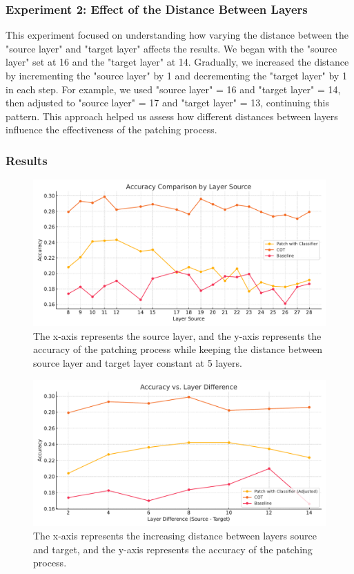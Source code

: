 \documentclass[11pt]{article}
\begin{document}
\subsubsection*{Experiment 2: Effect of the Distance Between Layers}
This experiment focused on understanding how varying the distance between the "source layer" and "target layer" affects the results. We began with the "source layer" set at 16 and the "target layer" at 14. Gradually, we increased the distance by incrementing the "source layer" by 1 and decrementing the "target layer" by 1 in each step. For example, we used "source layer" = 16 and "target layer" = 14, then adjusted to "source layer" = 17 and "target layer" = 13, continuing this pattern. This approach helped us assess how different distances between layers influence the effectiveness of the patching process.

\subsubsection*{Results}
\begin{figure}[!ht]
    \centering
    \includegraphics[width=\columnwidth]{figures/Accuracy_Comparison_by_Layer_Source.pdf}
    \caption{The x-axis represents the source layer, and the y-axis represents the accuracy of the patching process while keeping the distance between source layer and target layer constant at 5 layers.}
    \vspace{-.5cm}
\end{figure}
\begin{figure}[!ht]
    \centering
    \includegraphics[width=\columnwidth]{figures/Accuracy_vs_Layer_Difference.pdf}
    \caption{The x-axis represents the increasing distance between layers source and target, and the y-axis represents the accuracy of the patching process.}
    \vspace{-.5cm}
\end{figure}
\end{document}
